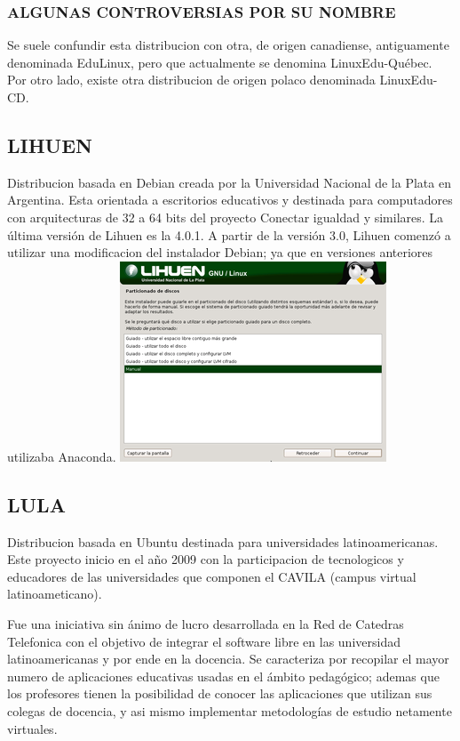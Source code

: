 \subsubsection*{ALGUNAS CONTROVERSIAS POR SU NOMBRE}

Se suele confundir esta distribucion con otra, de origen
canadiense, antiguamente denominada EduLinux, pero que
actualmente se denomina LinuxEdu-Québec.
Por otro lado, existe otra distribucion de origen polaco
denominada LinuxEdu-CD.

\subsection*{LIHUEN}
Distribucion basada en Debian creada por la
Universidad Nacional de la Plata en Argentina.
Esta orientada a escritorios educativos y destinada para
computadores con arquitecturas de 32 a 64 bits del proyecto
Conectar igualdad y similares.
La última versión de Lihuen es la 4.0.1.
A partir de la versión 3.0, Lihuen comenzó a utilizar una
modificacion del instalador Debian; ya que en versiones
anteriores utilizaba Anaconda.
\includegraphics[scale=0.5]{img/cp06/img0601.png}
\subsection*{LULA}
Distribucion basada en Ubuntu destinada para
universidades latinoamericanas.
Este proyecto inicio en el año 2009 con la participacion de
tecnologicos y educadores de las universidades que componen el
CAVILA (campus virtual latinoameticano).

Fue una iniciativa sin ánimo de lucro desarrollada en la Red de
Catedras Telefonica con el objetivo de integrar el software libre
en las universidad latinoamericanas y por ende en la docencia.
Se caracteriza por recopilar el mayor numero de aplicaciones
educativas usadas en el ámbito pedagógico; ademas que los
profesores tienen la posibilidad de conocer las aplicaciones que 
utilizan sus colegas de docencia, y asi mismo implementar
metodologías de estudio netamente virtuales.

